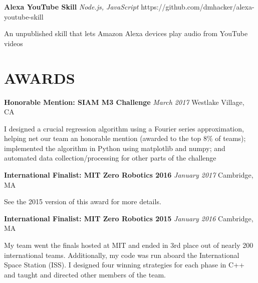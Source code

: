 \documentclass[fontsize=11pt]{article}
\newcommand{\sepspace}{\vspace*{1em}}   %
\newcommand{\NewPart}[1]{\section*{\uppercase{#1}}}
\newcommand{\EducationEntry}[4]{
    \noindent \textbf{#1} \hfill      %
    \colorbox{Black}{
      \parbox{8.5em}{
      \hfill\color{White}#2}} \par  %
    \noindent \textit{#3} \par        %
    \noindent\hangindent=2em\hangafter=0 \small #4 %
    \normalsize \par}
\newcommand{\ProjectEntry}[4]{         %
    \noindent \textbf{#1} \noindent \textit{#3} \hfill {#2} \par
    \noindent \small #4 %
    \normalsize \par}
\newcommand{\AwardEntry}[4]{         %
    \noindent \textbf{#1} \noindent \textit{#3} \hfill {#2} \par
    \noindent \small #4 %
    \normalsize \par}
\begin{document}
\ProjectEntry{Alexa YouTube Skill}{https://github.com/dmhacker/alexa-youtube-skill}
{Node.js, JavaScript}
{An unpublished skill that lets Amazon Alexa devices play audio from YouTube videos}
\NewPart{Awards}{}

\AwardEntry{Honorable Mention: SIAM M3 Challenge}{Westlake Village, CA}
{March 2017}
{I designed a crucial regression algorithm using a Fourier series approximation, helping net our team an honorable mention (awarded to the top 8\% of teams); implemented the algorithm in Python using matplotlib and numpy; and automated data collection/processing for other parts of the challenge}
\sepspace

\AwardEntry{International Finalist: MIT Zero Robotics 2016}{Cambridge, MA}
{January 2017}
{See the 2015 version of this award for more details.}
\sepspace

\AwardEntry{International Finalist: MIT Zero Robotics 2015}{Cambridge, MA}
{January 2016}
{My team went the finals hosted at MIT and ended in 3rd place out of nearly 200 international teams. Additionally, my code was run aboard the International Space Station (ISS). I designed four winning strategies for each phase in C++ and taught and directed other members of the team.}
\ 
\end{document}
